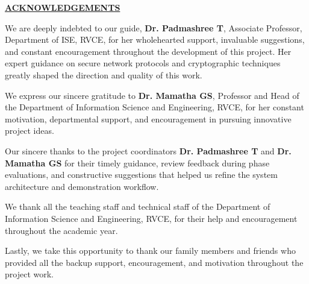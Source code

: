 \thispagestyle{empty}
\ifIDP \vspace{-1cm}\fi
\begin{center}
	\Large\textbf{\underline{ACKNOWLEDGEMENTS}} \par
\end{center}

We are deeply indebted to our guide, \textbf{Dr. Padmashree T}, Associate Professor, Department of ISE, RVCE, for her wholehearted support, invaluable suggestions, and constant encouragement throughout the development of this project. Her expert guidance on secure network protocols and cryptographic techniques greatly shaped the direction and quality of this work.\\ \par

We express our sincere gratitude to \textbf{Dr. Mamatha GS}, Professor and Head of the Department of Information Science and Engineering, RVCE, for her constant motivation, departmental support, and encouragement in pursuing innovative project ideas.\\ \par

Our sincere thanks to the project coordinators \textbf{Dr. Padmashree T} and \textbf{Dr. Mamatha GS} for their timely guidance, review feedback during phase evaluations, and constructive suggestions that helped us refine the system architecture and demonstration workflow.\\ \par


We thank all the teaching staff and technical staff of the Department of Information Science and Engineering, RVCE, for their help and encouragement throughout the academic year.\\ \par

Lastly, we take this opportunity to thank our family members and friends who provided all the backup support, encouragement, and motivation throughout the project work.\\ \par